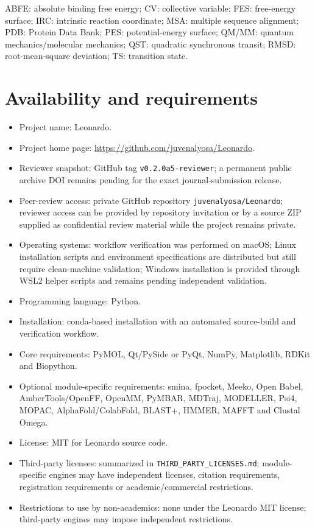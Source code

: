 \documentclass[pdflatex,sn-vancouver-num]{sn-jnl}
\begin{document}
ABFE: absolute binding free energy; CV: collective variable; FES: free-energy surface; IRC: intrinsic reaction coordinate; MSA: multiple sequence alignment; PDB: Protein Data Bank; PES: potential-energy surface; QM/MM: quantum mechanics/molecular mechanics; QST: quadratic synchronous transit; RMSD: root-mean-square deviation; TS: transition state.

\section*{Availability and requirements}

\begin{itemize}
\item Project name: Leonardo.
\item Project home page: \url{https://github.com/juvenalyosa/Leonardo}.
\item Reviewer snapshot: GitHub tag \texttt{v0.2.0a5-reviewer}; a permanent public archive DOI remains pending for the exact journal-submission release.
\item Peer-review access: private GitHub repository \texttt{juvenalyosa/Leonardo}; reviewer access can be provided by repository invitation or by a source ZIP supplied as confidential review material while the project remains private.
\item Operating systems: workflow verification was performed on macOS; Linux installation scripts and environment specifications are distributed but still require clean-machine validation; Windows installation is provided through WSL2 helper scripts and remains pending independent validation.
\item Programming language: Python.
\item Installation: conda-based installation with an automated source-build and verification workflow.
\item Core requirements: PyMOL, Qt/PySide or PyQt, NumPy, Matplotlib, RDKit and Biopython.
\item Optional module-specific requirements: smina, fpocket, Meeko, Open Babel, AmberTools/OpenFF, OpenMM, PyMBAR, MDTraj, MODELLER, Psi4, MOPAC, AlphaFold/ColabFold, BLAST+, HMMER, MAFFT and Clustal Omega.
\item License: MIT for Leonardo source code.
\item Third-party licenses: summarized in \texttt{THIRD\_PARTY\_LICENSES.md}; module-specific engines may have independent licenses, citation requirements, registration requirements or academic/commercial restrictions.
\item Restrictions to use by non-academics: none under the Leonardo MIT license; third-party engines may impose independent restrictions.
\end{itemize}
\end{document}
